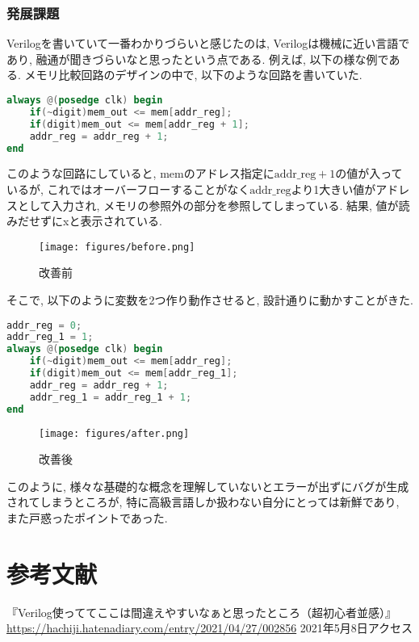 \documentclass[titlepage]{ltjsarticle}
\begin{document}
\subsubsection{発展課題}
Verilogを書いていて一番わかりづらいと感じたのは, Verilogは機械に近い言語であり, 融通が聞きづらいなと思ったという点である. 例えば, 以下の様な例である. メモリ比較回路のデザインの中で, 以下のような回路を書いていた. 
\begin{lstlisting}[caption=読み出し回路(一部 修正前),language=verilog]
always @(posedge clk) begin
    if(~digit)mem_out <= mem[addr_reg];
    if(digit)mem_out <= mem[addr_reg + 1];
    addr_reg = addr_reg + 1;
end
\end{lstlisting}
このような回路にしていると, memのアドレス指定に$\mbox{addr}\_\mbox{reg}+1$の値が入っているが, これではオーバーフローすることがなく$\mbox{addr}\_\mbox{reg}$より1大きい値がアドレスとして入力され, メモリの参照外の部分を参照してしまっている. 結果, 値が読みだせずにxと表示されている. 
\begin{figure}[H]
    \begin{center}
        \texttt{[image: figures/before.png]}
        \caption{改善前}
    \end{center}
\end{figure}
そこで, 以下のように変数を2つ作り動作させると, 設計通りに動かすことがきた. 
\begin{lstlisting}[caption=読み出し回路(一部 修正後),language=verilog]
addr_reg = 0;
addr_reg_1 = 1;
always @(posedge clk) begin
    if(~digit)mem_out <= mem[addr_reg];
    if(digit)mem_out <= mem[addr_reg_1];
    addr_reg = addr_reg + 1;
    addr_reg_1 = addr_reg_1 + 1;
end
\end{lstlisting}
\begin{figure}[H]
    \begin{center}
        \texttt{[image: figures/after.png]}
        \caption{改善後}
    \end{center}
\end{figure}
このように, 様々な基礎的な概念を理解していないとエラーが出ずにバグが生成されてしまうところが, 特に高級言語しか扱わない自分にとっては新鮮であり, また戸惑ったポイントであった. 
\section{参考文献}
『Verilog使っててここは間違えやすいなぁと思ったところ（超初心者並感）』\url{https://hachiji.hatenadiary.com/entry/2021/04/27/002856} 2021年5月8日アクセス
\end{document}
